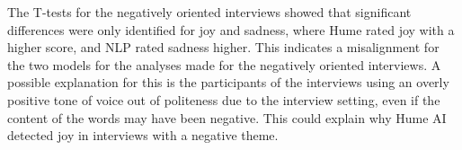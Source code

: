 The T-tests for the negatively oriented interviews showed that significant differences were only identified for joy and sadness, where Hume rated joy with a higher score, and NLP rated sadness higher. This indicates a misalignment for the two models for the analyses made for the negatively oriented interviews. A possible explanation for this is the participants of the interviews using an overly positive tone of voice out of politeness due to the interview setting, even if the content of the words may have been negative. This could explain why Hume AI detected joy in interviews with a negative theme.

